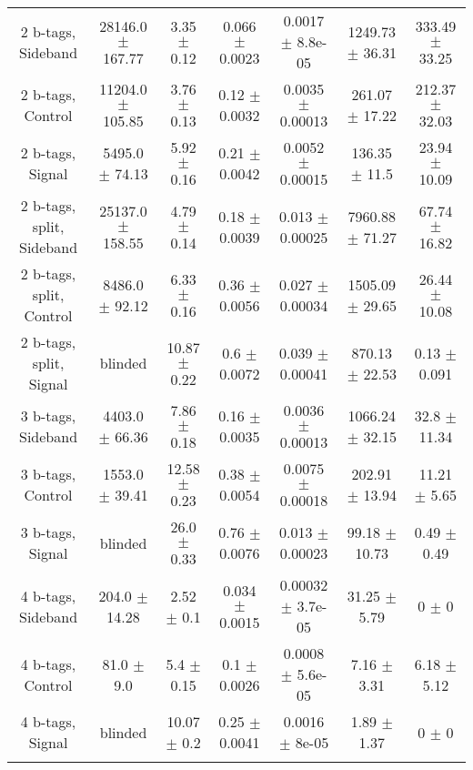 \begin{footnotesize}
\begin{tabular}{c|c|c|c|c|c|c}
2 b-tags, Sideband & 28146.0 $\pm$ 167.77 & 3.35 $\pm$ 0.12 & 0.066 $\pm$ 0.0023 & 0.0017 $\pm$ 8.8e-05 & 1249.73 $\pm$ 36.31 & 333.49 $\pm$ 33.25\\ 
2 b-tags, Control & 11204.0 $\pm$ 105.85 & 3.76 $\pm$ 0.13 & 0.12 $\pm$ 0.0032 & 0.0035 $\pm$ 0.00013 & 261.07 $\pm$ 17.22 & 212.37 $\pm$ 32.03\\ 
2 b-tags, Signal & 5495.0 $\pm$ 74.13 & 5.92 $\pm$ 0.16 & 0.21 $\pm$ 0.0042 & 0.0052 $\pm$ 0.00015 & 136.35 $\pm$ 11.5 & 23.94 $\pm$ 10.09\\ 
2 b-tags, split, Sideband & 25137.0 $\pm$ 158.55 & 4.79 $\pm$ 0.14 & 0.18 $\pm$ 0.0039 & 0.013 $\pm$ 0.00025 & 7960.88 $\pm$ 71.27 & 67.74 $\pm$ 16.82\\ 
2 b-tags, split, Control & 8486.0 $\pm$ 92.12 & 6.33 $\pm$ 0.16 & 0.36 $\pm$ 0.0056 & 0.027 $\pm$ 0.00034 & 1505.09 $\pm$ 29.65 & 26.44 $\pm$ 10.08\\ 
2 b-tags, split, Signal &  blinded  & 10.87 $\pm$ 0.22 & 0.6 $\pm$ 0.0072 & 0.039 $\pm$ 0.00041 & 870.13 $\pm$ 22.53 & 0.13 $\pm$ 0.091\\ 
3 b-tags, Sideband & 4403.0 $\pm$ 66.36 & 7.86 $\pm$ 0.18 & 0.16 $\pm$ 0.0035 & 0.0036 $\pm$ 0.00013 & 1066.24 $\pm$ 32.15 & 32.8 $\pm$ 11.34\\ 
3 b-tags, Control & 1553.0 $\pm$ 39.41 & 12.58 $\pm$ 0.23 & 0.38 $\pm$ 0.0054 & 0.0075 $\pm$ 0.00018 & 202.91 $\pm$ 13.94 & 11.21 $\pm$ 5.65\\ 
3 b-tags, Signal &  blinded  & 26.0 $\pm$ 0.33 & 0.76 $\pm$ 0.0076 & 0.013 $\pm$ 0.00023 & 99.18 $\pm$ 10.73 & 0.49 $\pm$ 0.49\\ 
4 b-tags, Sideband & 204.0 $\pm$ 14.28 & 2.52 $\pm$ 0.1 & 0.034 $\pm$ 0.0015 & 0.00032 $\pm$ 3.7e-05 & 31.25 $\pm$ 5.79 & 0 $\pm$ 0\\ 
4 b-tags, Control & 81.0 $\pm$ 9.0 & 5.4 $\pm$ 0.15 & 0.1 $\pm$ 0.0026 & 0.0008 $\pm$ 5.6e-05 & 7.16 $\pm$ 3.31 & 6.18 $\pm$ 5.12\\ 
4 b-tags, Signal &  blinded  & 10.07 $\pm$ 0.2 & 0.25 $\pm$ 0.0041 & 0.0016 $\pm$ 8e-05 & 1.89 $\pm$ 1.37 & 0 $\pm$ 0\\ 
& &  
\hline\hline 
\end{tabular} 
\end{footnotesize} 
\newline 
